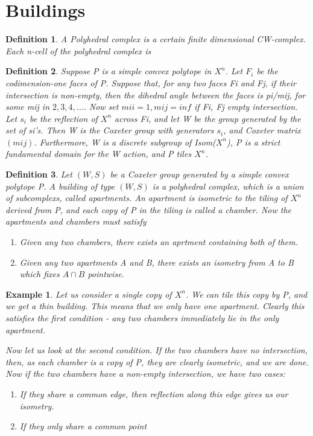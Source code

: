 \documentclass[12pt]{article}
\begin{document}
\newtheorem{definition}{Definition}
\newtheorem{theorem}{Theorem}
\newtheorem{example}{Example}
\newtheorem{lemma}{Lemma}
\newcommand{\uw}{\mathcal{U}(W,X)}
\tableofcontents
\section{Buildings}
\begin{definition}
  A Polyhedral complex is a certain finite dimensional CW-complex. Each n-cell of the polyhedral complex is   
\end{definition}

\begin{definition}
    Suppose P is a simple convex polytope in $X^n$. Let $F_i$ be the codimension-one faces of P. Suppose that, for any two faces Fi and Fj, if their intersection is non-empty, then the dihedral angle between the faces is pi/mij, for some mij in ${2,3,4,...}$. Now set $mii=1, mij=inf$ if Fi, Fj empty intersection. Let $s_i$ be the reflection of $X^n$ across Fi, and let W be the group generated by the set of si's. Then W is the Coxeter group with generators $s_i$, and Coxeter matrix $(mij)$. Furthermore, W is a discrete subgroup of Isom($X^n$), P is a strict fundamental domain for the W action, and P tiles $X^n$. 
\end{definition}   
    
\begin{definition}
    Let $(W,S)$ be a Coxeter group generated by a simple convex polytope P. A building of type $(W,S)$ is a polyhedral complex, which is a union of subcomplexs, called apartments. An apartment is isometric to the tiling of $X^n$ derived from P, and each copy of P in the tiling is called a chamber. Now the apartments and chambers must satisfy
    \begin{enumerate}
    \item Given any two chambers, there exists an aprtment containing both of them.
    \item Given any two apartments A and B, there exists an isometry from A to B which fixes $A \cap B$ pointwise. 
    \end{enumerate}
\end{definition}

\begin{example}
    Let us consider a single copy of $X^n$. We can tile this copy by P, and we get a thin building. This means that we only have one apartment. Clearly this satisfies the first condition - any two chambers immediately lie in the only apartment. 

    Now let us look at the second condition. If the two chambers have no intersection, then, as each chamber is a copy of P, they are clearly isometric, and we are done. Now if the two chambers have a non-empty intersection, we have two cases:
    \begin{enumerate}
        \item If they share a common edge, then reflection along this edge gives us our isometry.
        \item If they only share a common point
    \end{enumerate}
\end{example}
\end{document}
